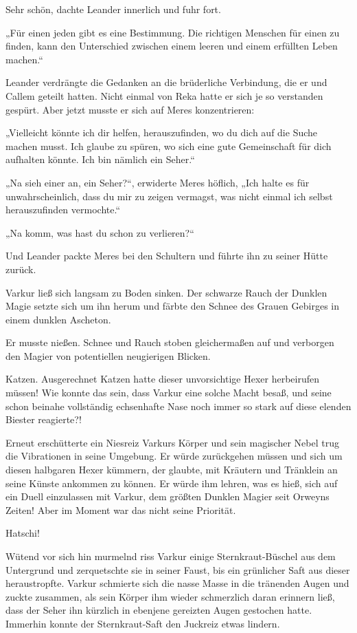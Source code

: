 Sehr schön, dachte Leander innerlich und fuhr fort.

„Für einen jeden gibt es eine Bestimmung. Die richtigen Menschen für einen zu finden, kann den Unterschied zwischen einem leeren und einem erfüllten Leben machen.“

Leander verdrängte die Gedanken an die brüderliche Verbindung, die er und Callem geteilt hatten. Nicht einmal von Reka hatte er sich je so verstanden gespürt. Aber jetzt musste er sich auf Meres konzentrieren:

„Vielleicht könnte ich dir helfen, herauszufinden, wo du dich auf die Suche machen musst. Ich glaube zu spüren, wo sich eine gute Gemeinschaft für dich aufhalten könnte. Ich bin nämlich ein Seher.“

„Na sieh einer an, ein Seher?“, erwiderte Meres höflich, „Ich halte es für unwahrscheinlich, dass du mir zu zeigen vermagst, was nicht einmal ich selbst herauszufinden vermochte.“

„Na komm, was hast du schon zu verlieren?“

Und Leander packte Meres bei den Schultern und führte ihn zu seiner Hütte zurück.\bigskip







Varkur ließ sich langsam zu Boden sinken. Der schwarze Rauch der Dunklen Magie setzte sich um ihn herum und färbte den Schnee des Grauen Gebirges in einem dunklen Ascheton.

Er musste nießen. Schnee und Rauch stoben gleichermaßen auf und verborgen den Magier von potentiellen neugierigen Blicken.

Katzen. Ausgerechnet Katzen hatte dieser unvorsichtige Hexer herbeirufen müssen! Wie konnte das sein, dass Varkur eine solche Macht besaß, und seine schon beinahe vollständig echsenhafte Nase noch immer so stark auf diese elenden Biester reagierte?!

Erneut erschütterte ein Niesreiz Varkurs Körper und sein magischer Nebel trug die Vibrationen in seine Umgebung. Er würde zurückgehen müssen und sich um diesen halbgaren Hexer kümmern, der glaubte, mit Kräutern und Tränklein an seine Künste ankommen zu können. Er würde ihm lehren, was es hieß, sich auf ein Duell einzulassen mit Varkur, dem größten Dunklen Magier seit Orweyns Zeiten! Aber im Moment war das nicht seine Priorität.

Hatschi!

Wütend vor sich hin murmelnd riss Varkur einige Sternkraut-Büschel aus dem Untergrund und zerquetschte sie in seiner Faust, bis ein grünlicher Saft aus dieser heraustropfte. Varkur schmierte sich die nasse Masse in die tränenden Augen und zuckte zusammen, als sein Körper ihm wieder schmerzlich daran erinnern ließ, dass der Seher ihn kürzlich in ebenjene gereizten Augen gestochen hatte. Immerhin konnte der Sternkraut-Saft den Juckreiz etwas lindern.

